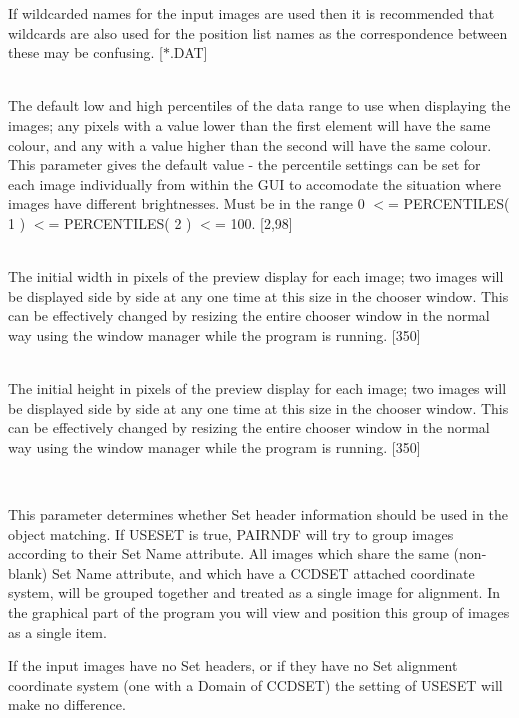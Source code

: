 \documentclass[twoside,11pt]{article}
\renewcommand{\_}{\texttt{\symbol{95}}}
\newcommand{\routine}[1]{{\sc #1}}
\newcommand{\sstsubsection}[1]{ \item[{#1}] \mbox{} \\}
\newcommand{\sstsubsection}[1]{\item[{#1}]}
\begin{document}
{{{         If wildcarded names for the input images are used then it is
         recommended that wildcards are also used for the position list
         names as the correspondence between these may be confusing.
         [$*$.DAT]
      }
      \sstsubsection{
         PERCENTILES( 2 ) = \_DOUBLE (Read)
      }{
         The default low and high percentiles of the data range to use
         when displaying the images; any pixels with a value lower than
         the first element will have the same colour, and any with a
         value higher than the second will have the same colour.  This
         parameter gives the default value - the percentile settings
         can be set for each image individually from within the GUI
         to accomodate the situation where images have different
         brightnesses.  Must be in the range 0 $<$= PERCENTILES( 1 )
         $<$= PERCENTILES( 2 ) $<$= 100.
         [2,98]
      }
      \sstsubsection{
         PREVX = \_INTEGER (Read and Write)
      }{
         The initial width in pixels of the preview display for each image;
         two images will be displayed side by side at any one time at
         this size in the chooser window.  This can be effectively changed
         by resizing the entire chooser window in the normal way using
         the window manager while the program is running.
         [350]
      }
      \sstsubsection{
         PREVY = \_INTEGER (Read and Write)
      }{
         The initial height in pixels of the preview display for each image;
         two images will be displayed side by side at any one time at
         this size in the chooser window.  This can be effectively changed
         by resizing the entire chooser window in the normal way using
         the window manager while the program is running.
         [350]
      }
      \sstsubsection{
         USESET = \_LOGICAL (Read)
      }{
         This parameter determines whether Set header information should
         be used in the object matching.  If USESET is true,
         \routine{PAIRNDF} will try to group images according to their Set Name
         attribute.  All images which share the same (non-blank) Set
         Name attribute, and which have a CCD\_SET attached coordinate
         system, will be grouped together and treated as a single
         image for alignment.  In the graphical part of the program you
         will view and position this group of images as a single item.

         If the input images have no Set headers, or if they have no
         Set alignment coordinate system (one with a Domain of CCD\_SET)
         the setting of USESET will make no difference.

}}}
\end{document}
